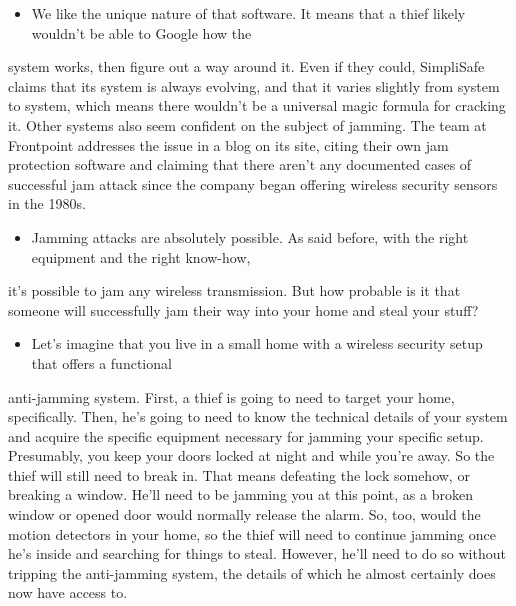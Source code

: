 \documentclass[UTF8,11pt]{ctexart}
\begin{document}
\begin{itemize}[leftmargin=2em,itemsep=.2em,topsep=.4em]\item[H.] We like the unique nature of that software. It means that a thief likely wouldn't be able to Google how the
\end{itemize}

system works, then figure out a way around it. Even if they could, SimpliSafe claims that its system is always evolving, and that it varies slightly from system to system, which means there wouldn't be a universal magic formula for cracking it. Other systems also seem confident on the subject of jamming. The team at Frontpoint addresses the issue in a blog on its site, citing their own jam protection software and claiming that there aren't any documented cases of successful jam attack since the company began offering wireless security sensors in the 1980s.


\begin{itemize}[leftmargin=2em,itemsep=.2em,topsep=.4em]\item[I.] Jamming attacks are absolutely possible. As said before, with the right equipment and the right know-how,
\end{itemize}

it's possible to jam any wireless transmission. But how probable is it that someone will successfully jam their way into your home and steal your stuff?


\begin{itemize}[leftmargin=2em,itemsep=.2em,topsep=.4em]\item[J.] Let's imagine that you live in a small home with a wireless security setup that offers a functional
\end{itemize}

anti-jamming system. First, a thief is going to need to target your home, specifically. Then, he's going to need to know the technical details of your system and acquire the specific equipment necessary for jamming your specific setup. Presumably, you keep your doors locked at night and while you're away. So the thief will still need to break in. That means defeating the lock somehow, or breaking a window. He'll need to be jamming you at this point, as a broken window or opened door would normally release the alarm. So, too, would the motion detectors in your home, so the thief will need to continue jamming once he's inside and searching for things to steal. However, he'll need to do so without tripping the anti-jamming system, the details of which he almost certainly does now have access to.
\end{document}
